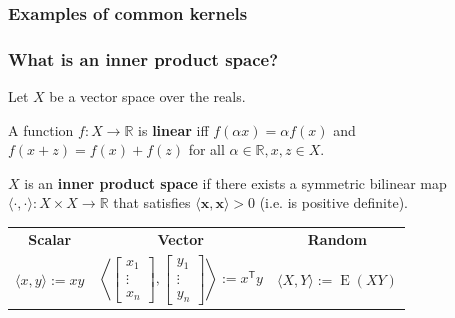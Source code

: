\documentclass{beamer}
\begin{document}
    \begin{frame}
        \frametitle{Examples of common kernels}
    \end{frame}

    \begin{frame}
        \frametitle{What is an inner product space?}
        Let $X$ be a vector space over the reals.
        \begin{definition}
            A function $f: X \rightarrow \mathbb R$ is \textbf{linear} iff $f(\alpha x)= \alpha f(x)$
            and $f(x+z)=f(x)+f(z)$ for all $\alpha\in\mathbb R, x,z \in X$.
        \end{definition}

        \begin{definition}
            $X$ is an \textbf{inner product space} if there exists a symmetric bilinear map $\langle \cdot ,\cdot \rangle :X\times X\to \mathbb R$ that satisfies $\langle \mathbf x,\mathbf x \rangle > 0$ (i.e. is positive definite).
        \end{definition}
        \begin{center}
            \begin{tabular}{ c c c }
                \textbf{Scalar} & \textbf{Vector} & \textbf{Random} \\
                $\langle x,y\rangle := xy$ &
                $\left\langle {\begin{bmatrix}x_{1}\\\vdots \\x_{n}\end{bmatrix}},{\begin{bmatrix}y_{1}\\\vdots \\y_{n}\end{bmatrix}}\right\rangle :=x^{\textsf {T}}y$ &
                $\langle X,Y\rangle :=\operatorname {E} (XY)$
            \end{tabular}
        \end{center}
    \end{frame}
\end{document}
